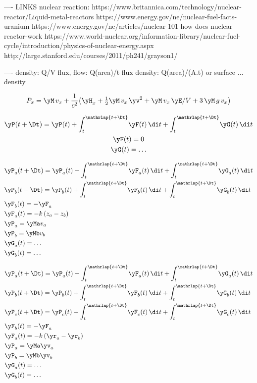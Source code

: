 ----
LINKS
nuclear reaction:
https://www.britannica.com/technology/nuclear-reactor/Liquid-metal-reactors
https://www.energy.gov/ne/nuclear-fuel-facts-uranium
https://www.energy.gov/ne/articles/nuclear-101-how-does-nuclear-reactor-work
https://www.world-nuclear.org/information-library/nuclear-fuel-cycle/introduction/physics-of-nuclear-energy.aspx
http://large.stanford.edu/courses/2011/ph241/grayson1/ %

----
density: Q/V
flux, flow: Q(area)/t
flux density: Q(area)/(A.t)
or surface ... density

$$
P_{x} = \yM\,v_{x} +
\frac{1}{c^{2}}\bigl(
\yH_{x} +
\tfrac12 \yM\,v_{x}\,\yv^{2}
+ \yM\,v_{x}\,\yE/V
+ 3\,\yM\,g\,v_{x}
\bigr)
$$

$$
\begin{gathered}
  \yP(t+\Dt) = \yP(t) + \int_{t}^{\mathrlap{t+\Dt}}\!\yF(t)\,\di t + \int_{t}^{\mathrlap{t+\Dt}}\!\yG(t)\,\di t
  \\
  \yF(t) = 0
  \\
  \yG(t) = \dotso
\end{gathered}
$$

$$
\begin{aligned}
  &\yP_a(t+\Dt) = \yP_a(t) + \int_{t}^{\mathrlap{t+\Dt}}\!\yF_a(t)\,\di t + \int_{t}^{\mathrlap{t+\Dt}}\!\yG_a(t)\,\di t
  \\
  &\yP_b(t+\Dt) = \yP_b(t) + \int_{t}^{\mathrlap{t+\Dt}}\!\yF_b(t)\,\di t + \int_{t}^{\mathrlap{t+\Dt}}\!\yG_b(t)\,\di t
  \\
  &\yF_{b}(t) = -\yF_{a}
  \\
  &\yF_{a}(t) = -k\, (z_{a}-z_{b})
  \\
  &\yP_{a} = \yMa v_{a}
  \\
  &\yP_{b} = \yMb v_{b}
  \\
  &\yG_{a}(t) = \dotso
  \\
  &\yG_{b}(t) = \dotso
\end{aligned}
$$

$$
\begin{aligned}
  &\yP_a(t+\Dt) = \yP_a(t) + \int_{t}^{\mathrlap{t+\Dt}}\!\yF_a(t)\,\di t + \int_{t}^{\mathrlap{t+\Dt}}\!\yG_a(t)\,\di t
  \\
  &\yP_b(t+\Dt) = \yP_b(t) + \int_{t}^{\mathrlap{t+\Dt}}\!\yF_b(t)\,\di t + \int_{t}^{\mathrlap{t+\Dt}}\!\yG_b(t)\,\di t
  \\
  &\yP_c(t+\Dt) = \yP_c(t) + \int_{t}^{\mathrlap{t+\Dt}}\!\yF_c(t)\,\di t + \int_{t}^{\mathrlap{t+\Dt}}\!\yG_c(t)\,\di t
  \\
  &\yF_{b}(t) = -\yF_{a}
  \\
  &\yF_{a}(t) = -k\, (\yr_{a}-\yr_{b})
  \\
  &\yP_{a} = \yMa \yv_{a}
  \\
  &\yP_{b} = \yMb \yv_{b}
  \\
  &\yG_{a}(t) = \dotso
  \\
  &\yG_{b}(t) = \dotso
\end{aligned}
$$

